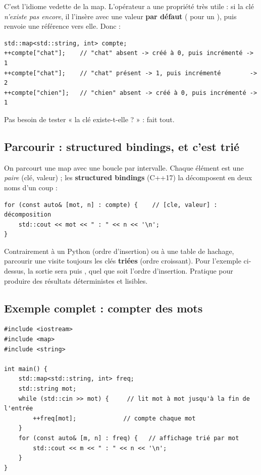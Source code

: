 \documentclass[11pt]{article}
\begin{document}
C'est l'idiome vedette de la map. L'opérateur \code{[]} a une propriété très
utile : si la clé \emph{n'existe pas encore}, il l'insère avec une valeur
\textbf{par défaut} ( pour un ), puis renvoie une référence
vers elle. Donc :

\begin{lstlisting}
std::map<std::string, int> compte;
++compte["chat"];    // "chat" absent -> créé à 0, puis incrémenté -> 1
++compte["chat"];    // "chat" présent -> 1, puis incrémenté        -> 2
++compte["chien"];   // "chien" absent -> créé à 0, puis incrémenté -> 1
\end{lstlisting}

Pas besoin de tester « la clé existe-t-elle ? » :  fait tout.

\subsection*{Parcourir : structured bindings, et c'est trié}

On parcourt une map avec une boucle  par intervalle. Chaque élément
est une \emph{paire} (clé, valeur) ; les \textbf{structured bindings}
(C++17) la décomposent en deux noms d'un coup :

\begin{lstlisting}
for (const auto& [mot, n] : compte) {    // [cle, valeur] : décomposition
    std::cout << mot << " : " << n << '\n';
}
\end{lstlisting}

\begin{aretenir}
Contrairement à un  Python (ordre d'insertion) ou à une table de
hachage, parcourir une  visite toujours les clés \textbf{triées}
(ordre croissant). Pour l'exemple ci-dessus, la sortie sera  puis
, quel que soit l'ordre d'insertion. Pratique pour produire des
résultats déterministes et lisibles.
\end{aretenir}

\subsection*{Exemple complet : compter des mots}

\begin{lstlisting}
#include <iostream>
#include <map>
#include <string>

int main() {
    std::map<std::string, int> freq;
    std::string mot;
    while (std::cin >> mot) {     // lit mot à mot jusqu'à la fin de l'entrée
        ++freq[mot];             // compte chaque mot
    }
    for (const auto& [m, n] : freq) {   // affichage trié par mot
        std::cout << m << " : " << n << '\n';
    }
}
\end{lstlisting}
\end{document}
